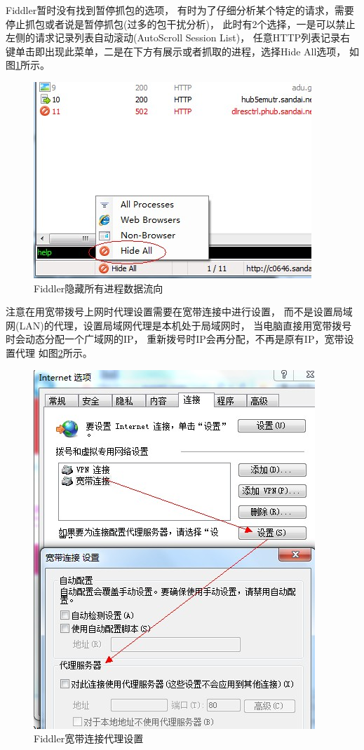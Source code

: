 \documentclass{book}
\begin{document}
Fiddler暂时没有找到暂停抓包的选项，
有时为了仔细分析某个特定的请求，需要停止抓包或者说是暂停抓包(过多的包干扰分析)，
此时有2个选择，一是可以禁止左侧的请求记录列表自动滚动(AutoScroll Session List)，
任意HTTP列表记录右键单击即出现此菜单，二是在下方有展示或者抓取的进程，选择Hide All选项，
如图\ref{fig:HideAllProcessCapture}所示。

\begin{figure}[htbp]
	\centering
	\includegraphics[scale=0.5]{HideAllProcessCapture.jpg}
	\caption{Fiddler隐藏所有进程数据流向}
	\label{fig:HideAllProcessCapture}
\end{figure}

注意在用宽带拨号上网时代理设置需要在宽带连接中进行设置，
而不是设置局域网(LAN)的代理，设置局域网代理是本机处于局域网时，
当电脑直接用宽带拨号时会动态分配一个广域网的IP，
重新拨号时IP会再分配，不再是原有IP，宽带设置代理
如图\ref{fig:BrandwithProxySetting}所示。

\begin{figure}[htbp]
	\centering
	\includegraphics[scale=0.5]{BrandwithProxySetting.jpg}
	\caption{Fiddler宽带连接代理设置}
	\label{fig:BrandwithProxySetting}
\end{figure}
\end{document}
